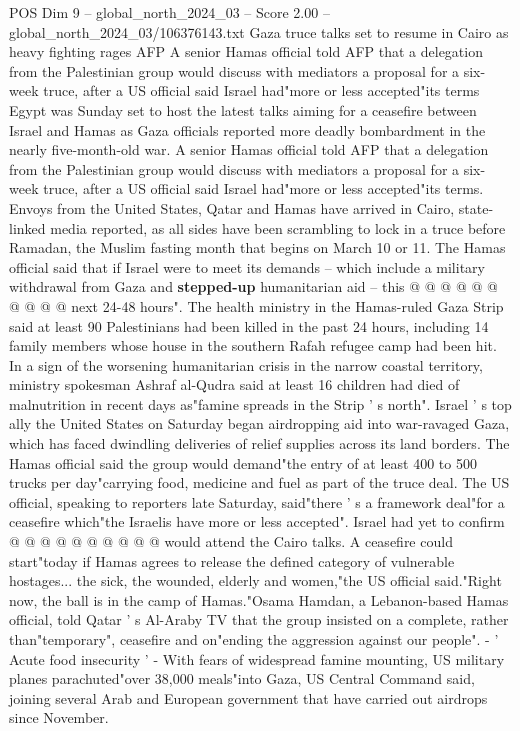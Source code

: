\begin{textsample}{POS Dim 9 – global\_north\_2024\_03 – Score 2.00 – global\_north\_2024\_03/106376143.txt}  \label{ex:f9_pos_195}
Gaza truce talks set to resume in Cairo as heavy fighting rages AFP A senior Hamas official told AFP that a delegation from the Palestinian group would discuss with mediators a proposal for a six-week truce, after a US official said Israel had"more or less accepted"its terms Egypt was Sunday set to host the latest talks aiming for a ceasefire between Israel and Hamas as Gaza officials reported more deadly bombardment in the nearly five-month-old war.
A senior Hamas official told AFP that a delegation from the Palestinian group would discuss with mediators a proposal for a six-week truce, after a US official said Israel had"more or less accepted"its terms.
Envoys from the United States, Qatar and Hamas have arrived in Cairo, state-linked media reported, as all sides have been scrambling to lock in a truce before Ramadan, the Muslim fasting month that begins on March 10 or 11.
The Hamas official said that if Israel were to meet its demands -- which include a military withdrawal from Gaza and \textbf{stepped-up} humanitarian aid -- this @ @ @ @ @ @ @ @ @ @ next 24-48 hours".
The health ministry in the Hamas-ruled Gaza Strip said at least 90 Palestinians had been killed in the past 24 hours, including 14 family members whose house in the southern Rafah refugee camp had been hit.
In a sign of the worsening humanitarian crisis in the narrow coastal territory, ministry spokesman Ashraf al-Qudra said at least 16 children had died of malnutrition in recent days as"famine spreads in the Strip ' s north".
Israel ' s top ally the United States on Saturday began airdropping aid into war-ravaged Gaza, which has faced dwindling deliveries of relief supplies across its land borders.
The Hamas official said the group would demand"the entry of at least 400 to 500 trucks per day"carrying food, medicine and fuel as part of the truce deal.
The US official, speaking to reporters late Saturday, said"there ' s a framework deal"for a ceasefire which"the Israelis have more or less accepted".
Israel had yet to confirm @ @ @ @ @ @ @ @ @ @ would attend the Cairo talks.
A ceasefire could start"today if Hamas agrees to release the defined category of vulnerable hostages... the sick, the wounded, elderly and women,"the US official said."Right now, the ball is in the camp of Hamas."Osama Hamdan, a Lebanon-based Hamas official, told Qatar ' s Al-Araby TV that the group insisted on a complete, rather than"temporary", ceasefire and on"ending the aggression against our people". - ' Acute food insecurity ' - With fears of widespread famine mounting, US military planes parachuted"over 38,000 meals"into Gaza, US Central Command said, joining several Arab and European government that have carried out airdrops since November.

\end{textsample}
